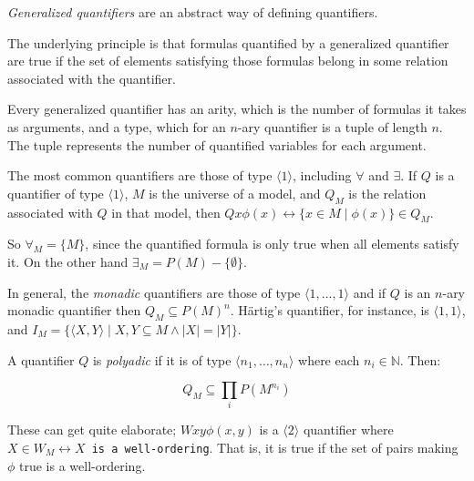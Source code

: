 \documentclass[12pt]{article}
\begin{document}
\emph{Generalized quantifiers} are an abstract way of defining quantifiers.

The underlying principle is that formulas quantified by a generalized quantifier are true if the set of elements satisfying those formulas belong in some relation associated with the quantifier.

Every generalized quantifier has an arity, which is the number of formulas it takes as arguments, and a type, which for an $n$-ary quantifier is a tuple of length $n$.  The tuple represents the number of quantified variables for each argument.

The most common quantifiers are those of type $\langle 1\rangle$, including $\forall$ and $\exists$.  If $Q$ is a quantifier of type $\langle 1\rangle$, $M$ is the universe of a model, and $Q_M$ is the relation associated with $Q$ in that model, then $Qx\phi(x)\leftrightarrow \{x\in M\mid \phi(x)\}\in Q_M$.

So $\forall_M=\{M\}$, since the quantified formula is only true when all elements satisfy it.  On the other hand $\exists_M=P(M)-\{\emptyset\}$.

In general, the \emph{monadic} quantifiers are those of type $\langle 1,\ldots, 1\rangle$ and if $Q$ is an $n$-ary monadic quantifier then $Q_M\subseteq P(M)^n$.  H\"artig's quantifier, for instance, is $\langle 1,1\rangle$, and $I_M=\{\langle X,Y\rangle\mid X,Y\subseteq M\wedge |X|=|Y|\}$.

A quantifier $Q$ is \emph{polyadic} if it is of type $\langle n_1,\ldots, n_n\rangle$ where each $n_i\in\mathbb{N}$.  Then:

$$Q_M\subseteq \prod_{i} P(M^{n_i})$$

These can get quite elaborate; $Wxy\phi(x,y)$ is a $\langle 2\rangle$ quantifier where $X\in W_M\leftrightarrow X$\texttt{ is a well-ordering}.  That is, it is true if the set of pairs making $\phi$ true is a well-ordering.
\end{document}
